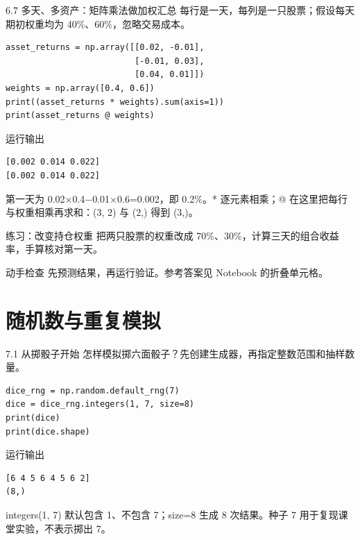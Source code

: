 \documentclass[9pt]{ctexbeamer}
\begin{document}
\begin{frame}[fragile]{6.7 多天、多资产：矩阵乘法做加权汇总}
\small 每行是一天，每列是一只股票；假设每天期初权重均为 40\%、60\%，忽略交易成本。
\medskip
\begin{lstlisting}
asset_returns = np.array([[0.02, -0.01],
                          [-0.01, 0.03],
                          [0.04, 0.01]])
weights = np.array([0.4, 0.6])
print((asset_returns * weights).sum(axis=1))
print(asset_returns @ weights)
\end{lstlisting}
\begin{exampleblock}{运行输出}
\begin{lstlisting}
[0.002 0.014 0.022]
[0.002 0.014 0.022]
\end{lstlisting}
\end{exampleblock}
\small 第一天为 0.02×0.4−0.01×0.6=0.002，即 0.2\%。* 逐元素相乘；@ 在这里把每行与权重相乘再求和：(3, 2) 与 (2,) 得到 (3,)。
\end{frame}

\begin{frame}{练习：改变持仓权重}
把两只股票的权重改成 70\%、30\%，计算三天的组合收益率，手算核对第一天。
\medskip
\begin{block}{动手检查}
先预测结果，再运行验证。参考答案见 Notebook 的折叠单元格。
\end{block}
\end{frame}

\section{随机数与重复模拟}

\begin{frame}[fragile]{7.1 从掷骰子开始}
\small 怎样模拟掷六面骰子？先创建生成器，再指定整数范围和抽样数量。
\medskip
\begin{lstlisting}
dice_rng = np.random.default_rng(7)
dice = dice_rng.integers(1, 7, size=8)
print(dice)
print(dice.shape)
\end{lstlisting}
\begin{exampleblock}{运行输出}
\begin{lstlisting}
[6 4 5 6 4 5 6 2]
(8,)
\end{lstlisting}
\end{exampleblock}
\small integers(1, 7) 默认包含 1、不包含 7；size=8 生成 8 次结果。种子 7 用于复现课堂实验，不表示掷出 7。
\end{frame}
\end{document}
